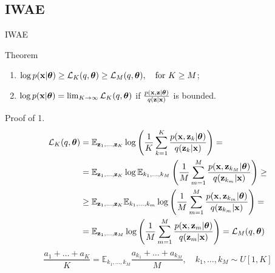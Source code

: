 \subsection{IWAE}
\begin{frame}{IWAE}
	\begin{block}{Theorem}
		\begin{enumerate}
			\item $\log p(\mathbf{x} | \boldsymbol{\theta}) \geq \mathcal{L}_K (q, \boldsymbol{\theta}) \geq \mathcal{L}_M (q, \boldsymbol{\theta}), \quad \text{for } K \geq M$;
			\item $\log p(\mathbf{x} | \boldsymbol{\theta}) = \lim_{K \rightarrow \infty} \mathcal{L}_K (q, \boldsymbol{\theta})$ if $\frac{p(\mathbf{x}, \mathbf{z} | \boldsymbol{\theta})}{q(\mathbf{z} | \mathbf{x})}$ is bounded.
		\end{enumerate}
		\vspace{-0.2cm}
	\end{block}
	\begin{block}{Proof of 1.}
		{ \footnotesize
			\vspace{-0.6cm}
			\begin{align*}
				\mathcal{L}_K (q, \boldsymbol{\theta}) &= \mathbb{E}_{\mathbf{z}_1, \dots, \mathbf{z}_K} \log \left( \frac{1}{K}\sum_{k=1}^K\frac{p(\mathbf{x}, \mathbf{z}_k | \boldsymbol{\theta})}{q(\mathbf{z}_k| \mathbf{x})} \right) = \\
				&= \mathbb{E}_{\mathbf{z}_1, \dots, \mathbf{z}_K} \log \mathbb{E}_{k_1, \dots, k_M} \left( \frac{1}{M}\sum_{m=1}^M\frac{p(\mathbf{x}, \mathbf{z}_{k_M} | \boldsymbol{\theta})}{q(\mathbf{z}_{k_m}| \mathbf{x})} \right) \geq \\
				&\geq \mathbb{E}_{\mathbf{z}_1, \dots, \mathbf{z}_K} \mathbb{E}_{k_1, \dots, k_m} \log \left( \frac{1}{M}\sum_{m=1}^M\frac{p(\mathbf{x}, \mathbf{z}_{k_m} | \boldsymbol{\theta})}{q(\mathbf{z}_{k_m}| \mathbf{x})} \right) = \\
				&= \mathbb{E}_{\mathbf{z}_1, \dots, \mathbf{z}_M} \log \left( \frac{1}{M}\sum_{m=1}^M\frac{p(\mathbf{x}, \mathbf{z}_m | \boldsymbol{\theta})}{q(\mathbf{z}_m| \mathbf{x})} \right) = \mathcal{L}_M (q, \boldsymbol{\theta})
			\end{align*}
			\[
			\frac{a_1 + \dots + a_K}{K} = \mathbb{E}_{k_1, \dots, k_M} \frac{a_{k_1} + \dots + a_{k_M}}{M}, \quad k_1, \dots, k_M \sim U[1, K]
			\]
		}
	\end{block}
	
\end{frame}
